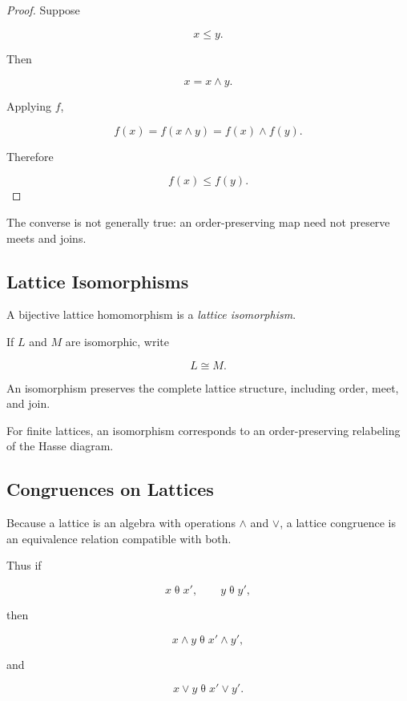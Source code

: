 \begin{proof}
Suppose

\[ x\leq y. \]

Then

\[ x=x\wedge y. \]

Applying \(f\),

\[ f(x)=f(x\wedge y)=f(x)\wedge f(y). \]

Therefore

\[ f(x)\leq f(y). \]
\end{proof}

The converse is not generally true: an order-preserving map need not
preserve meets and joins.

\subsection{Lattice Isomorphisms}
\label{subsec:lattice-isomorphisms}

A bijective lattice homomorphism is a \emph{lattice isomorphism}.

If \(L\) and \(M\) are isomorphic, write

\[ L\cong M. \]

An isomorphism preserves the complete lattice structure, including order,
meet, and join.

For finite lattices, an isomorphism corresponds to an order-preserving
relabeling of the Hasse diagram.

\subsection{Congruences on Lattices}
\label{subsec:lattice-congruences}

Because a lattice is an algebra with operations \(\wedge\) and \(\vee\), a
lattice congruence is an equivalence relation compatible with both.

Thus if

\[ x\mathrel{\theta}x',\qquad y\mathrel{\theta}y', \]

then

\[ x\wedge y\mathrel{\theta}x'\wedge y', \]

and

\[ x\vee y\mathrel{\theta}x'\vee y'. \]

